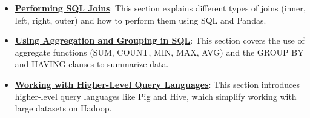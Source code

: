 \documentclass{article}%
\begin{document}
\begin{itemize}[leftmargin=*]
\item \href{https://purdue.brightspace.com/d2l/common/assets/pdfjs-d2l-dist/1.0.14-legacy/web/viewer.html?file=\%2Fcontent\%2Fenforced\%2F1095465-WL.202510.CS24200.LE1\%2F23L2-relationaldb-sql.pdf\%3Fou\%3D1095465\&lang=en-us\&container=d2l-fileviewer-rendered-pdf\&fullscreen=d2l-fileviewer-rendered-pdf-dialog\&height=667#page=27}{\textbf{Performing SQL Joins}}: This section explains different types of joins (inner, left, right, outer) and how to perform them using SQL and Pandas.%
\item \href{https://purdue.brightspace.com/d2l/common/assets/pdfjs-d2l-dist/1.0.14-legacy/web/viewer.html?file=\%2Fcontent\%2Fenforced\%2F1095465-WL.202510.CS24200.LE1\%2F23L2-relationaldb-sql.pdf\%3Fou\%3D1095465\&lang=en-us\&container=d2l-fileviewer-rendered-pdf\&fullscreen=d2l-fileviewer-rendered-pdf-dialog\&height=667#page=45}{\textbf{Using Aggregation and Grouping in SQL}}: This section covers the use of aggregate functions (SUM, COUNT, MIN, MAX, AVG) and the GROUP BY and HAVING clauses to summarize data.%
\item \href{https://purdue.brightspace.com/d2l/common/assets/pdfjs-d2l-dist/1.0.14-legacy/web/viewer.html?file=\%2Fcontent\%2Fenforced\%2F1095465-WL.202510.CS24200.LE1\%2F23L2-relationaldb-sql.pdf\%3Fou\%3D1095465\&lang=en-us\&container=d2l-fileviewer-rendered-pdf\&fullscreen=d2l-fileviewer-rendered-pdf-dialog\&height=667#page=55}{\textbf{Working with Higher{-}Level Query Languages}}: This section introduces higher-level query languages like Pig and Hive, which simplify working with large datasets on Hadoop.%
\end{itemize}%
\end{document}
